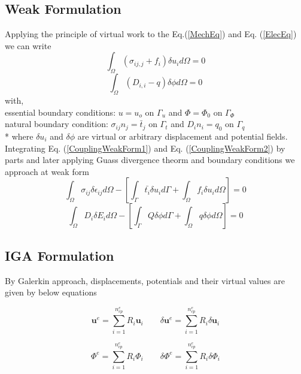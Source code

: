 \documentclass[12pt]{article}
\begin{document}
\subsection{Weak Formulation}
Applying the principle of virtual work to the Eq.(\ref{MechEq})
and Eq. (\ref{ElecEq}) we can write
\begin{equation} \label{CouplingWeakForm1}
\int_\Omega ( \sigma_{ij,j} + f_i ) \delta u_i d\Omega = 0  
\end{equation}
\begin{equation} \label{CouplingWeakForm2}
\int_\Omega (D_{i,i} - q ) \delta \phi d\Omega = 0
\end{equation}
with, \\
essential boundary conditions:
$u = u_o$ on $\Gamma_u$ and $\Phi=\Phi_0$ on $\Gamma_\Phi$ \\
natural boundary condition:
$\sigma_{ij}n_j = \bar{t}_j$ on $\Gamma_t$ and $D_i n_i = q_0$ on $\Gamma_q$ \\*
where $\delta u_i$ and $\delta \phi$ are virtual or arbitrary displacement and potential fields. \\
Integrating Eq. (\ref{CouplingWeakForm1}) and Eq. (\ref{CouplingWeakForm2}) by parts and later applying Guass divergence theorm and boundary conditions we approach at weak form
\begin{equation} \label{FinalCouplingWeakForm1}
\int_\Omega \sigma_{ij} \delta \epsilon_{ij} d\Omega - \left[ \int_{\Gamma} \bar{t_i} \delta u_i d\Gamma + \int_\Omega f_i \delta u_i d\Omega  \right]= 0 
\end{equation}
\begin{equation} \label{FinalCouplingWeakForm2}
\int_\Omega D_i \delta E_i d\Omega - \left[ \int_{\Gamma} Q \delta \phi d\Gamma + \int_\Omega q \delta \phi d\Omega \right] = 0
\end{equation}


\subsection{IGA Formulation}
By Galerkin approach, displacements, potentials and their virtual values are given by below equations

\begin{equation} \label{u_and_du_2}
\textbf{u}^e = \sum_{i=1}^{n_{cp}^e} R_i \textbf{u}_i \qquad \delta\textbf{u}^e = \sum_{i=1}^{n_{cp}^e} R_i \delta\textbf{u}_i
\end{equation}

\begin{equation} \label{Phi_and_dPhi_2}
\Phi^e = \sum_{i=1}^{n_{cp}^e} R_i \Phi_i \qquad \delta\Phi^e = \sum_{i=1}^{n_{cp}^e} R_i \delta\Phi_i
\end{equation}
\end{document}
